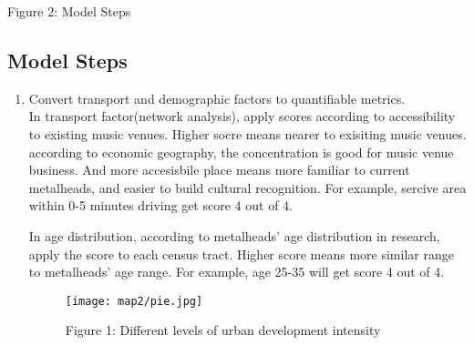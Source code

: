 \documentclass[11pt]{article}
\begin{document}
\begin{center}
\centering
Figure 2: Model Steps
\end{center}

\subsection{Model Steps}

\begin{enumerate}
\item{Convert transport and demographic factors to quantifiable metrics.\\
In transport factor(network analysis), apply scores according to accessibility to existing  music venues. Higher socre means nearer to exisiting music venues. according to economic geography, the concentration is good for music venue business. And more accesisbile place means more familiar to current metalheads, and easier to build cultural recognition. For example, sercive area within 0-5 minutes driving get score 4 out of 4.

In age distribution, according to metalheads' age distribution in research, apply the score to each census tract. Higher score means more similar range to metalheads' age range. For example, age 25-35 will get score 4 out of 4.



\begin{figure}[H]
\begin{center}
\centering
\texttt{[image: map2/pie.jpg]}
\caption{Figure 1: Different levels of urban development intensity}
\label{fig:figure1}
\end{center}
\end{figure}

}
\end{enumerate}
\end{document}
